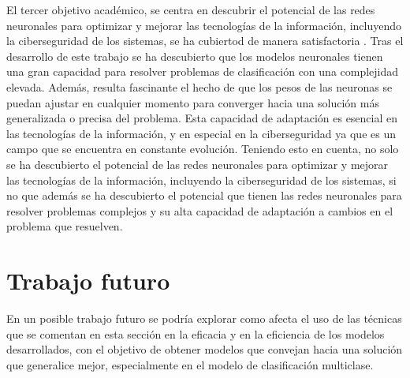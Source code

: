 El tercer objetivo académico, se centra en descubrir el potencial de las redes neuronales para optimizar y mejorar las tecnologías de la información, incluyendo la ciberseguridad de los sistemas, se ha cubiertod de manera satisfactoria . Tras el desarrollo de este trabajo se ha descubierto que los modelos neuronales tienen una gran capacidad para resolver problemas de clasificación con una complejidad elevada. Además, resulta fascinante el hecho de que los pesos de las neuronas se puedan ajustar en cualquier momento para converger hacia una solución más generalizada o precisa del problema. Esta capacidad de adaptación es esencial en las tecnologías de la información, y en especial en la ciberseguridad ya que es un campo que se encuentra en constante evolución. Teniendo esto en cuenta, no solo se ha descubierto el potencial de las redes neuronales para optimizar y mejorar las tecnologías de la información, incluyendo la ciberseguridad de los sistemas, si no que además se ha descubierto el potencial que tienen las redes neuronales para resolver problemas complejos y su alta capacidad de adaptación a cambios en el problema que resuelven.



\section{Trabajo futuro}
En un posible trabajo futuro se podría explorar como afecta el uso de las técnicas que se comentan en esta sección en la eficacia y en la eficiencia de los modelos desarrollados, con el objetivo de obtener modelos que convejan hacia una solución que generalice mejor, especialmente en el modelo de clasificación multiclase.

